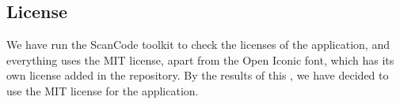 \subsection{License}

We have run the ScanCode toolkit to check the licenses of the application, and everything uses the MIT license, apart from the Open Iconic font, which has its own license added in the repository. By the results of this \cite{scancode}, we have decided to use the MIT license for the application.